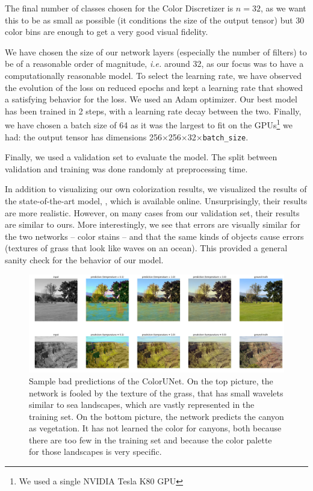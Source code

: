 \documentclass[10pt,twocolumn,letterpaper]{article}
\begin{document}
The final number of classes chosen for the Color Discretizer is $n=32$, as we want this to be as small as possible (it conditions the size of the output tensor) but 30 color bins are enough to get a very good visual fidelity.

We have chosen the size of our network layers (especially the number of filters) to be of a reasonable order of magnitude, \textit{i.e.} around 32, as our focus was to have a computationally reasonable model. To select the learning rate, we have observed the evolution of the loss on reduced epochs and kept a learning rate that showed a satisfying behavior for the loss. We used an Adam optimizer. Our best model has been trained in 2 steps, with a learning rate decay between the two. Finally, we have chosen a batch size of 64 as it was the largest to fit on the GPUs\footnote{We used a single NVIDIA Tesla K80 GPU} we had: the output tensor has dimensions 256$\times$256$\times$32$\times$\texttt{batch\_size}.

Finally, we used a validation set to evaluate the model. The split between validation and training  was done randomly at preprocessing time.

In addition to visualizing our own colorization results, we visualized the results of the state-of-the-art model, \cite{zhang2016colorful}, which is available online. Unsurprisingly, their results are more realistic. However, on many cases from our validation set, their results are similar to ours. More interestingly, we see that errors are visually similar for the two networks -- \ie color stains -- and that the same kinds of objects cause errors (\eg textures of grass that look like waves on an ocean). This provided a general sanity check for the behavior of our model.
\begin{figure}
\begin{center}
\includegraphics[width=450px]{worse}
\caption{Sample bad predictions of the ColorUNet. On the top picture, the network is fooled by the texture of the grass, that has small wavelets similar to sea landscapes, which are vastly represented in the training set. On the bottom picture, the network predicts the canyon as vegetation. It has not learned the color for canyons, both because there are too few in the training set and because the color palette for those landscapes is very specific.}
\label{worse}
\end{center}
\end{figure}
\end{document}
